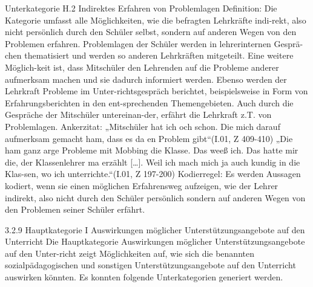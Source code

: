 Unterkategorie H.2 Indirektes Erfahren von Problemlagen
Definition: Die Kategorie umfasst alle Möglichkeiten, wie die befragten Lehrkräfte indi-rekt, also nicht persönlich durch den Schüler selbst, sondern auf anderen Wegen von den Problemen erfahren. Problemlagen der Schüler werden in lehrerinternen Gesprä-chen thematisiert und werden so anderen Lehrkräften mitgeteilt. Eine weitere Möglich-keit ist, dass Mitschüler den Lehrenden auf die Probleme anderer aufmerksam machen und sie dadurch informiert werden. Ebenso werden der Lehrkraft Probleme im Unter-richtsgespräch berichtet, beispielsweise in Form von Erfahrungsberichten in den ent-sprechenden Themengebieten. Auch durch die Gespräche der Mitschüler untereinan-der, erfährt die Lehrkraft z.T. von Problemlagen.
Ankerzitat: „Mitschüler hat ich och schon. Die mich darauf aufmerksam gemacht ham, dass es da en Problem gibt“(I.01, Z 409-410) 
„Die ham ganz arge Probleme mit Mobbing die Klasse. Das weeß ich. Das hatte mir die, der Klassenlehrer ma erzählt […]. Weil ich mach mich ja auch kundig in die Klas-sen, wo ich unterrichte.“(I.01, Z 197-200)
Kodierregel: Es werden Aussagen kodiert, wenn sie einen möglichen Erfahrensweg aufzeigen, wie der Lehrer indirekt, also nicht durch den Schüler persönlich sondern auf anderen Wegen von den Problemen seiner Schüler erfährt.

3.2.9 Hauptkategorie I Auswirkungen möglicher Unterstützungsangebote auf den Unterricht
Die Hauptkategorie Auswirkungen möglicher Unterstützungsangebote auf den Unter-richt zeigt Möglichkeiten auf, wie sich die benannten sozialpädagogischen und sonstigen Unterstützungsangebote auf den Unterricht auswirken könnten. Es konnten folgende Unterkategorien generiert werden.

